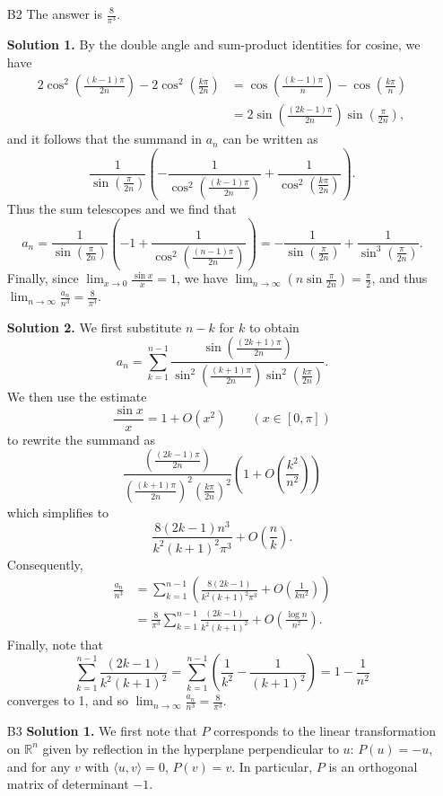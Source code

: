 \documentclass[amssymb,twocolumn,pra,10pt,aps]{revtex4-1}
\begin{document}
\begin{itemize}
\item[B2]
The answer is $\frac{8}{\pi^3}$.

\noindent
\textbf{Solution 1.}
By the double angle and sum-product identities for cosine, we have
\begin{align*}
2\cos^2\left(\frac{(k-1)\pi}{2n}\right) - 2\cos^2 \left(\frac{k\pi}{2n}\right) &= \cos\left(\frac{(k-1)\pi}{n}\right) - \cos\left(\frac{k\pi}{n}\right) \\
&= 2\sin\left(\frac{(2k-1)\pi}{2n}\right) \sin\left(\frac{\pi}{2n}\right),
\end{align*}
and it follows that the summand in $a_n$ can be written as
\[
\frac{1}{\sin\left(\frac{\pi}{2n}\right)} \left(-\frac{1}{\cos^2\left(\frac{(k-1)\pi}{2n}\right)}+\frac{1}{\cos^2\left(\frac{k\pi}{2n}\right)}\right).
\]
Thus the sum telescopes and we find that
\[
a_n = \frac{1}{\sin\left(\frac{\pi}{2n}\right)} \left(-1+\frac{1}{\cos^2\left(\frac{(n-1)\pi}{2n}\right)}\right) =
- \frac{1}{\sin\left(\frac{\pi}{2n}\right)}+ \frac{1}{\sin^3\left(\frac{\pi}{2n}\right)}.
\]
Finally, since $\lim_{x\to 0} \frac{\sin x}{x} = 1$, we have $\lim_{n\to\infty} \left( n\sin\frac{\pi}{2n} \right) = \frac{\pi}{2}$, and thus
$\lim_{n\to\infty} \frac{a_n}{n^3} = \frac{8}{\pi^3}$.

\noindent
\textbf{Solution 2.}
We first substitute $n-k$ for $k$ to obtain
\[
a_n=\sum_{k=1}^{n-1} \frac{\sin\left(\frac{(2k+1)\pi}{2n}\right)}{\sin^2\left(\frac{(k+1)\pi}{2n}\right)\sin^2\left(\frac{k\pi}{2n}\right)}.
\]
We then use the estimate
\[
\frac{\sin x}{x} = 1 + O(x^2) \qquad (x \in [0, \pi])
\]
to rewrite the summand as
\[
\frac{\left( \frac{(2k-1)\pi}{2n} \right)}{\left(\frac{(k+1)\pi}{2n}\right)^2 \left(\frac{k\pi}{2n}\right)^2} \left(1 + O\left( \frac{k^2}{n^2} \right) \right)
\]
which simplifies to
\[
\frac{8 (2k-1) n^3}{k^2 (k+1)^2 \pi^3} + O\left( \frac{n}{k} \right).
\]
Consequently,
\begin{align*}
\frac{a_n}{n^3} &= \sum_{k=1}^{n-1} \left( \frac{8 (2k-1)}{k^2 (k+1)^2 \pi^3} + O\left( \frac{1}{kn^2} \right) \right) \\
&= \frac{8}{\pi^3} \sum_{k=1}^{n-1} \frac{(2k-1)}{k^2 (k+1)^2} 
+ O \left( \frac{\log n}{n^2} \right). 
\end{align*}
Finally, note that
\[
\sum_{k=1}^{n-1} \frac{(2k-1)}{k^2 (k+1)^2} = 
\sum_{k=1}^{n-1} \left( \frac{1}{k^2} - \frac{1}{(k+1)^2}\right) = 1 - \frac{1}{n^2}
\]
converges to 1, and so $\lim_{n \to \infty} \frac{a_n}{n^3} = \frac{8}{\pi^3}$.

\item[B3]
\noindent
\textbf{Solution 1.}
We first note that $P$ corresponds to the linear transformation on $\mathbb{R}^n$ given by reflection in the hyperplane perpendicular to $u$: $P(u) = -u$, and for any $v$ with $\langle u,v\rangle = 0$, $P(v) = v$. In particular, $P$ is an orthogonal matrix of determinant $-1$.


\end{itemize}
\end{document}
